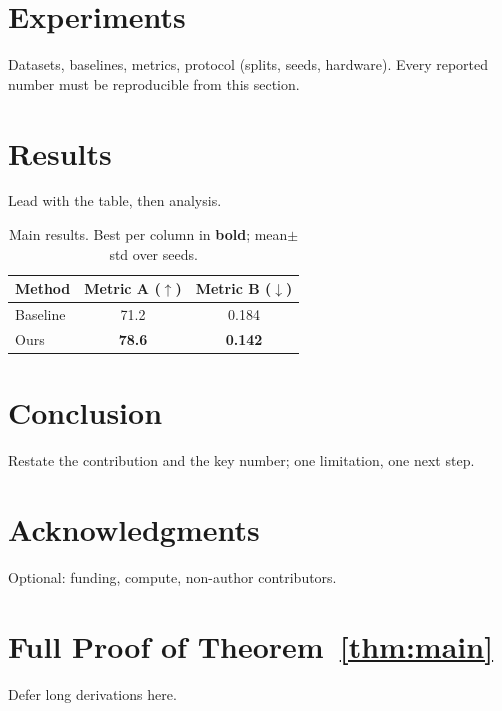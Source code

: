 \documentclass[11pt]{article}
\theoremstyle{plain}
\theoremstyle{definition}
\begin{document}
\section{Experiments}\label{sec:exp}
Datasets, baselines, metrics, protocol (splits, seeds, hardware). Every reported
number must be reproducible from this section.

\section{Results}\label{sec:results}
Lead with the table, then analysis.
\begin{table}[t]
\centering
\caption{Main results. Best per column in \textbf{bold}; mean$\pm$std over seeds.}
\label{tab:main}
\begin{tabular}{lcc}
\toprule
Method & Metric A ($\uparrow$) & Metric B ($\downarrow$) \\
\midrule
Baseline \citep{ref_baseline} & 71.2 & 0.184 \\
Ours                          & \textbf{78.6} & \textbf{0.142} \\
\bottomrule
\end{tabular}
\end{table}


\section{Conclusion}
Restate the contribution and the key number; one limitation, one next step.

\section*{Acknowledgments}
Optional: funding, compute, non-author contributors.



\appendix
\section{Full Proof of Theorem~\ref{thm:main}}
Defer long derivations here.
\end{document}
